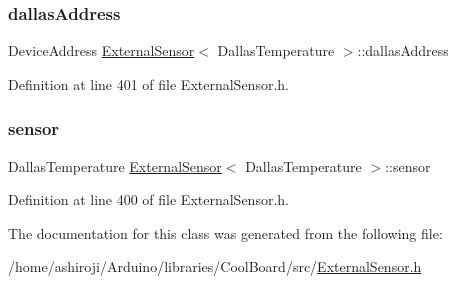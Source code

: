 \subsubsection{\texorpdfstring{dallas\+Address}{dallasAddress}}
{\footnotesize\ttfamily Device\+Address \hyperlink{class_external_sensor}{External\+Sensor}$<$ Dallas\+Temperature $>$\+::dallas\+Address\hspace{0.3cm}{\ttfamily [private]}}



Definition at line 401 of file External\+Sensor.\+h.

\mbox{\label{class_external_sensor_3_01_dallas_temperature_01_4_adb6ba4fcdedef95ad8f6b0c9b6c0f9d1}} 
\subsubsection{\texorpdfstring{sensor}{sensor}}
{\footnotesize\ttfamily Dallas\+Temperature \hyperlink{class_external_sensor}{External\+Sensor}$<$ Dallas\+Temperature $>$\+::sensor\hspace{0.3cm}{\ttfamily [private]}}



Definition at line 400 of file External\+Sensor.\+h.



The documentation for this class was generated from the following file\+:\begin{DoxyCompactItemize}
\item 
/home/ashiroji/\+Arduino/libraries/\+Cool\+Board/src/\hyperlink{_external_sensor_8h}{External\+Sensor.\+h}\end{DoxyCompactItemize}
